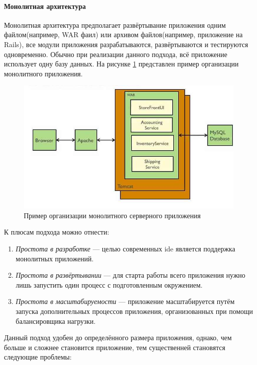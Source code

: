 \paragraph {Монолитная архитектура}
Монолитная архитектура предполагает развёртывание приложения одним файлом(например, WAR фаил) или архивом файлов(например, приложение на Rails), все модули приложения разрабатываются, развёртываются и тестируются одновременно. Обычно при реализации данного подхода, всё приложение использует одну базу данных. На рисунке \ref{sec:analysis:research:arch:back:monolith} представлен пример организации монолитного приложения. \cite{microservices:ma}

\begin{figure}[h]
  \centering
    \includegraphics[width=1\textwidth]{inc/img/backend-monolith.jpg}
  \caption{Пример организации монолитного серверного приложения}
  \label{sec:analysis:research:arch:back:monolith}
\end{figure}

К плюсам подхода можно отнести:

\begin{enumerate}
	\item \textit{Простота в разработке} --- целью современных \gls{ide} является поддержка монолитных приложений.
	\item \textit{Простота в развёртывании} --- для старта работы всего приложения нужно лишь запустить один процесс с подготовленным окружением.
	\item \textit{Простота в масштабируемости} --- приложение масштабируется путём запуска дополнительных процессов приложения, организованных при помощи балансировщика нагрузки.
\end{enumerate}

Данный подход удобен до определённого размера приложения, однако, чем больше и сложнее становится приложение, тем существенней становятся следующие проблемы:

